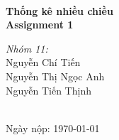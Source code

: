 \documentclass[a4paper,12pt]{article}
\title{
    \vspace{2in}
    \textbf{\Large \hmwkClass} \\[1em]
    \textmd{\LARGE \hmwkTitle} \\[2em]
    \vspace{2in}
}
\author{\hmwkAuthors}
\date{\hmwkDate}
\newcommand{\hmwkTitle}{Assignment 1}
\newcommand{\hmwkClass}{Thống kê nhiều chiều}
\newcommand{\hmwkAuthors}{
    Nguyễn Chí Tiến \\
    Nguyễn Thị Ngọc Anh \\
    Nguyễn Tiến Thịnh
}
\newcommand{\hmwkDate}{\today}
\begin{document}
\begin{titlepage}
    \centering
    \vspace*{3cm}
    {\Huge \textbf{\hmwkClass}}\\[1.5cm]
    {\LARGE \textbf{\hmwkTitle}}\\[1cm]
    \vspace{2cm}
    {\Large
    \textit{Nhóm 11:}\\[0.5cm]
    \hmwkAuthors
    }\\[3cm]
    {\Large Ngày nộp: \hmwkDate}\\
    \vfill
\end{titlepage}

\tableofcontents
\newpage






% 
\end{document}
